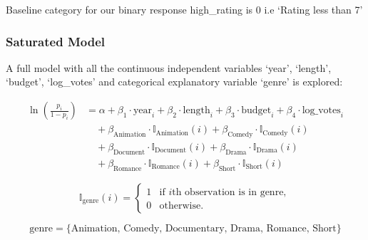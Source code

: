 \documentclass[
  letterpaper,
  DIV=11,
  numbers=noendperiod]{scrartcl}
\begin{document}
Baseline category for our binary response high\_rating is 0 i.e `Rating
less than 7'

\hypertarget{sec-sat.model}{%
\subsubsection{Saturated Model}\label{sec-sat.model}}

A full model with all the continuous independent variables `year',
`length', `budget', `log\_votes' and categorical explanatory variable
`genre' is explored:

\[\begin{aligned}\ln\left(\frac{p_i}{1-p_i}\right) &= \alpha + \beta_1 \cdot \textrm{year}_i + \beta_2 \cdot \textrm{length}_i + \beta_3 \cdot \textrm{budget}_i  + \beta_4 \cdot \textrm{log_votes}_i \\&\quad + \beta_{\textrm{Animation}} \cdot \mathbb{I}_{\textrm{Animation}}(i) + \beta_{\textrm{Comedy}} \cdot \mathbb{I}_{\textrm{Comedy}}(i) \\&\quad + \beta_{\textrm{Document}} \cdot \mathbb{I}_{\textrm{Document}}(i) + \beta_{\textrm{Drama}} \cdot \mathbb{I}_{\textrm{Drama}}(i) \\&\quad + \beta_{\textrm{Romance}} \cdot \mathbb{I}_{\textrm{Romance}}(i) + \beta_{\textrm{Short}} \cdot \mathbb{I}_{\textrm{Short}}(i)\end{aligned}\]

\[\mathbb{I}_{\textrm{genre}}(i) = \begin{cases}
1 & \textrm{if } i\textrm{th observation is in genre}, \\
0 & \textrm{otherwise}.
\end{cases}\]

\[\textrm{genre} = \{\textrm{Animation, Comedy, Documentary, Drama, Romance, Short}\}\]
\clearpage
\end{document}
